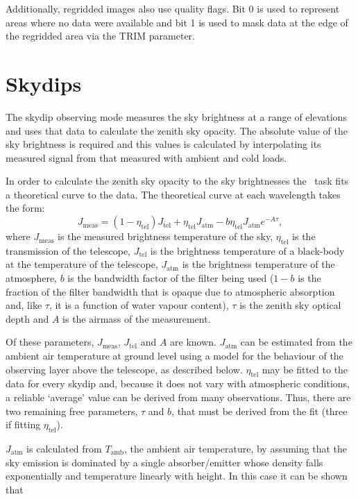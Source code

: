 \documentclass[twoside,11pt]{starlink}
\providecommand{\task}[1]{#1}
\providecommand{\skydip}{\htmlref{\task{skydip}}{SKYDIP}}
\begin{document}
Additionally, regridded images also use quality flags. Bit 0 is used
to represent areas where no data were available and bit 1 is used to mask
data at the edge of the regridded area via the TRIM parameter.

\section{Skydips\label{skydips}}

The skydip observing mode measures the sky brightness at a range of elevations
and uses that data to calculate the zenith sky opacity. The absolute
value of the sky brightness is required and this values
is calculated by interpolating its measured signal from that measured with
ambient and cold loads.

In order to calculate the zenith sky opacity to the sky brightnesses
the \skydip\ task fits a theoretical curve to the data. The theoretical
curve at each wavelength takes the form:
\begin{equation}
J_{\mathrm{meas}} = (1 - \eta_{\mathrm{tel}}) J_{\mathrm{tel}} +
                   \eta_{\mathrm{tel}} J_{\mathrm{atm}} -
                   b  \eta_{\mathrm{tel}} J_{\mathrm{atm}} e^{-A\tau},
\end{equation}
where $J_{\mathrm{meas}}$ is the measured brightness temperature of the
sky, $\eta_{\mathrm{tel}}$ is the transmission of the telescope,
$J_{\mathrm{tel}}$ is the brightness temperature of a black-body at the
temperature of the telescope, $J_{\mathrm{atm}}$ is the brightness
temperature of the atmosphere, $b$ is the bandwidth factor of the filter
being used ($1-b$ is the fraction of the filter bandwidth that is opaque
due to atmospheric absorption and, like $\tau$, it is a function of water
vapour content), $\tau$ is the zenith sky optical depth and $A$ is the
airmass of the measurement.

Of these parameters, $J_{\mathrm{meas}}$, $J_{\mathrm{tel}}$  and $A$ are known.
$J_{\mathrm{atm}}$ can be estimated from the ambient air temperature at ground
level using a model for the behaviour of the observing layer above the
telescope, as described below. $\eta_{\mathrm{tel}}$ may be fitted to the data
for every skydip and, because it does not vary with atmospheric conditions, a
reliable `average' value can be derived from many observations. Thus, there
are two remaining free parameters, $\tau$ and $b$, that must be derived
from the fit (three if fitting $\eta_{\mathrm{tel}}$).

$J_{\mathrm{atm}}$ is calculated from $T_{\mathrm{amb}}$, the ambient air
temperature, by assuming that the sky emission is dominated by a single
absorber/emitter whose density falls exponentially and temperature linearly
with height. In this case it can be shown that
\end{document}
